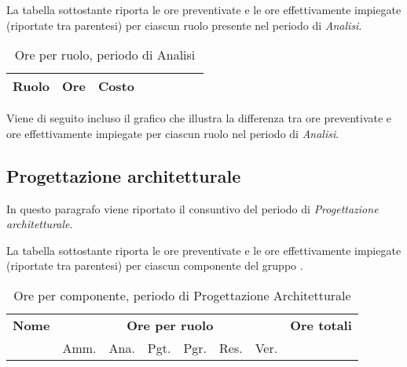 La tabella sottostante riporta le ore preventivate e le ore effettivamente impiegate (riportate tra parentesi) per ciascun ruolo presente nel periodo di \textit{Analisi}.

\begin{table}[H]
\begin{tabular}{lccccccc}
\toprule
    \textbf{Ruolo}  & \textbf{Ore} & \textbf{Costo} \\
    \midrule
    
    	
    
    \bottomrule
\end{tabular}
\caption{Ore per ruolo, periodo di Analisi}
\end{table}

Viene di seguito incluso il grafico che illustra la differenza tra ore preventivate e ore effettivamente impiegate per ciascun ruolo nel periodo di \textit{Analisi}.

%

\subsection{Progettazione architetturale}

In questo paragrafo viene riportato il consuntivo del periodo di \textit{Progettazione architetturale}.

La tabella sottostante riporta le ore preventivate e le ore effettivamente impiegate (riportate tra parentesi) per ciascun componente del gruppo \GroupName{}.

\begin{table}[H]
\begin{tabular}{lccccccc}
\toprule
    \textbf{Nome}  & \multicolumn{6}{c}{\textbf{Ore per ruolo}} & \textbf{Ore totali} \\
     & Amm. & Ana. & Pgt. & Pgr. & Res. & Ver. & \\
    \midrule
    
    	
    
    \bottomrule
\end{tabular}
\caption{Ore per componente, periodo di Progettazione Architetturale}
\end{table}

